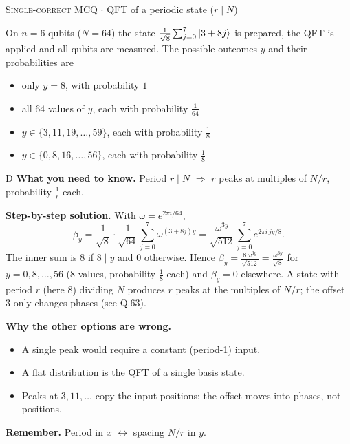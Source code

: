 \documentclass[11pt,a4paper]{article}
\newcommand{\optlabel}[1]{\textbf{(#1)}}
\newcommand{\correctlabel}[1]{\textcolor{okgreen}{\textbf{(#1)}\,\ding{51}}}
\newenvironment{qitem}[1]{\begin{list}{}{\setlength{\leftmargin}{3.3em}\setlength{\labelwidth}{3.1em}%
  \setlength{\labelsep}{0.2em}\setlength{\topsep}{3pt}\setlength{\parsep}{3pt}}\item[\textbf{Q.#1}\hfill]}{\end{list}}
\newcommand{\qsep}{\par\vspace{2pt}{\color{black!15}\hrule}\vspace{4pt}}
\newcommand{\qmeta}[2]{{\footnotesize\color{black!60}\textsc{#1} \;$\cdot$\; #2}\par}
\begin{document}
\begin{qitem}{61}
\qmeta{Single-correct MCQ}{QFT of a periodic state ($r\mid N$)}
On $n = 6$ qubits ($N = 64$) the state $\frac{1}{\sqrt8}\sum_{j=0}^{7}\ket{3 + 8j}$ is prepared, the QFT is applied and all
qubits are measured. The possible outcomes $y$ and their probabilities are
\begin{itemize}[leftmargin=2.6em, labelsep=0.4em, itemsep=2pt, topsep=3pt]
\item[\optlabel{A}] only $y = 8$, with probability $1$
\item[\optlabel{B}] all $64$ values of $y$, each with probability $\frac{1}{64}$
\item[\optlabel{C}] $y \in \{3, 11, 19, \dots, 59\}$, each with probability $\frac18$
\item[\correctlabel{D}] $y \in \{0, 8, 16, \dots, 56\}$, each with probability $\frac18$
\end{itemize}
\end{qitem}
\begin{solbox}{D}
\textbf{\color{brand}What you need to know.} Period $r \mid N$ $\Rightarrow$ $r$ peaks at multiples of $N/r$, probability $\frac1r$ each.

\textbf{\color{brand}Step-by-step solution.} With $\omega = e^{2\pi i/64}$,
\[ \beta_y = \frac{1}{\sqrt8}\cdot\frac{1}{\sqrt{64}}\sum_{j=0}^{7}\omega^{(3+8j)y} = \frac{\omega^{3y}}{\sqrt{512}}\sum_{j=0}^{7} e^{2\pi i\,jy/8}. \]
The inner sum is $8$ if $8 \mid y$ and $0$ otherwise. Hence $\beta_y = \frac{8\,\omega^{3y}}{\sqrt{512}} = \frac{\omega^{3y}}{\sqrt8}$ for
$y = 0, 8, \dots, 56$ (8 values, probability $\frac18$ each) and $\beta_y = 0$ elsewhere. A state with period $r$ (here $8$)
dividing $N$ produces $r$ peaks at the multiples of $N/r$; the offset $3$ only changes phases (see Q.63).

\textbf{\color{brand}Why the other options are wrong.}
\begin{itemize}[leftmargin=2.4em, itemsep=1pt, topsep=2pt]
\item[\textbf{(A)}] A single peak would require a constant (period-1) input.
\item[\textbf{(B)}] A flat distribution is the QFT of a single basis state.
\item[\textbf{(C)}] Peaks at $3, 11, \dots$ copy the input positions; the offset moves into phases, not positions.
\end{itemize}
\textbf{\color{brand}Remember.} Period in $x$ $\leftrightarrow$ spacing $N/r$ in $y$.
\end{solbox}
\qsep
\end{document}
